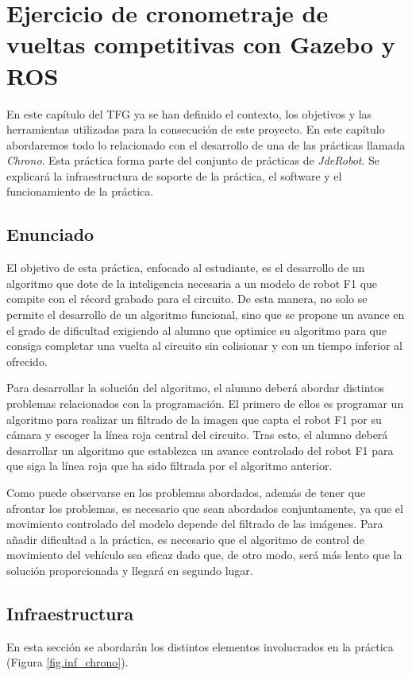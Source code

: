\chapter{Ejercicio de cronometraje de vueltas competitivas con Gazebo y ROS}\label{cap.chrono}
En este capítulo del TFG ya se han definido el contexto, los objetivos y las herramientas utilizadas para la consecución de este proyecto. En este capítulo abordaremos todo lo relacionado con el desarrollo de una de las prácticas llamada \textit{Chrono}. Esta práctica forma parte del conjunto de prácticas de \textit{JdeRobot}. Se explicará la infraestructura de soporte de la práctica, el software y el funcionamiento de la práctica.

\section{Enunciado}\label{sec.enunciado}
El objetivo de esta práctica, enfocado al estudiante, es el desarrollo de un algoritmo que dote de la inteligencia necesaria a un modelo de robot F1 que compite con el récord grabado para el circuito. De esta manera, no solo se permite el desarrollo de un algoritmo funcional, sino que se propone un avance en el grado de dificultad exigiendo al alumno que optimice su algoritmo para que consiga completar una vuelta al circuito sin colisionar y con un tiempo inferior al ofrecido.

Para desarrollar la solución del algoritmo, el alumno deberá abordar distintos problemas relacionados con la programación. El primero de ellos es programar un algoritmo para realizar un filtrado de la imagen que capta el robot F1 por su cámara y escoger la línea roja central del circuito. Tras esto, el alumno deberá desarrollar un algoritmo que establezca un avance controlado del robot F1 para que siga la línea roja que ha sido filtrada por el algoritmo anterior.

Como puede observarse en los problemas abordados, además de tener que afrontar los problemas, es necesario que sean abordados conjuntamente, ya que el movimiento controlado del modelo depende del filtrado de las imágenes. Para añadir dificultad a la práctica, es necesario que el algoritmo de control de movimiento del vehículo sea eficaz dado que, de otro modo, será más lento que la solución proporcionada y llegará en segundo lugar.

\section{Infraestructura}
En esta sección se abordarán los distintos elementos involucrados en la práctica (Figura \ref{fig.inf_chrono}).


